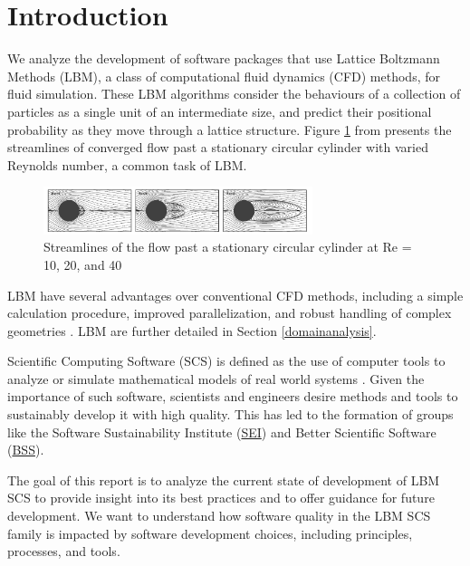 \documentclass[12pt, notitlepage]{article}
\begin{document}
\section{Introduction}

We analyze the development of software packages that use Lattice Boltzmann Methods (LBM), a class of computational fluid dynamics (CFD) methods, for fluid simulation. These LBM algorithms consider the behaviours of a collection of particles as a single unit of an intermediate size, and predict their positional probability as they move through a lattice structure. Figure \ref{circularflow} from \citep{chen2021phase} presents the streamlines of converged flow past a stationary circular cylinder with varied Reynolds number, a common task of LBM.

\begin{figure}[h!]
	\begin{center}
		\includegraphics[width=0.7\textwidth]{circularflow}
		\caption{Streamlines of the flow past a stationary circular cylinder at Re = 10, 20, and 40}
		\label{circularflow}
	\end{center}
\end{figure}

LBM have several advantages over conventional CFD methods, including a simple calculation procedure, improved parallelization, and robust handling of complex geometries \citep{ganji2015application}. LBM are further detailed in Section \ref{domainanalysis}. 

Scientific Computing Software (SCS) is defined as the use of computer tools to analyze or simulate mathematical models of real world systems \citep{smith2006systematic}. Given the importance of such software, scientists and engineers desire methods and tools to sustainably develop it with high quality. This has led to the formation of groups like the Software Sustainability Institute (\href{https://www.software.ac.uk/}{SEI}) and Better Scientific Software (\href{https://bssw.io/}{BSS}). 

The goal of this report is to analyze the current state of development of LBM SCS to provide insight into its best practices and to offer guidance for future development. We want to understand how software quality in the LBM SCS family is impacted by software development choices, including principles, processes, and tools.
\end{document}
